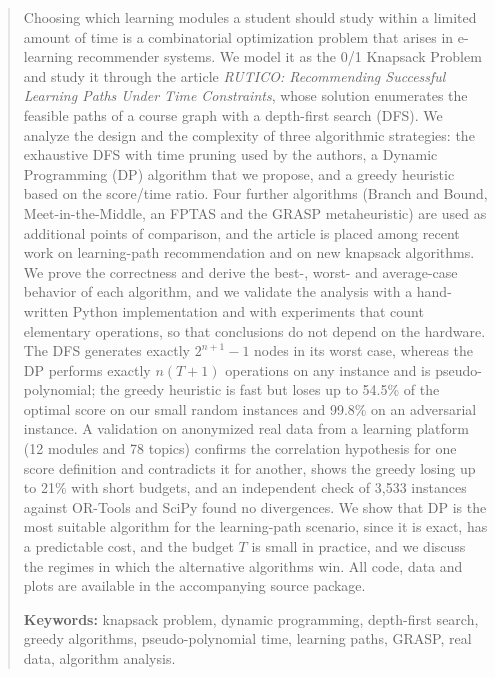 \documentclass[11pt,a4paper]{article}
\theoremstyle{plain}
\theoremstyle{definition}
\theoremstyle{remark}
\renewcommand{\_}{\textunderscore\hspace{0pt}}  %
\begin{document}
\begin{abstract}
\noindent Choosing which learning modules a student should study within a limited amount of time is a combinatorial optimization problem that arises in e-learning recommender systems. We model it as the 0/1 Knapsack Problem and study it through the article \emph{RUTICO: Recommending Successful Learning Paths Under Time Constraints}, whose solution enumerates the feasible paths of a course graph with a depth-first search (DFS). We analyze the design and the complexity of three algorithmic strategies: the exhaustive DFS with time pruning used by the authors, a Dynamic Programming (DP) algorithm that we propose, and a greedy heuristic based on the score/time ratio. Four further algorithms (Branch and Bound, Meet-in-the-Middle, an FPTAS and the GRASP metaheuristic) are used as additional points of comparison, and the article is placed among recent work on learning-path recommendation and on new knapsack algorithms. We prove the correctness and derive the best-, worst- and average-case behavior of each algorithm, and we validate the analysis with a hand-written Python implementation and with experiments that count elementary operations, so that conclusions do not depend on the hardware. The DFS generates exactly $2^{n+1}-1$ nodes in its worst case, whereas the DP performs exactly $n(T+1)$ operations on any instance and is pseudo-polynomial; the greedy heuristic is fast but loses up to 54.5\% of the optimal score on our small random instances and 99.8\% on an adversarial instance. A validation on anonymized real data from a learning platform (12 modules and 78 topics) confirms the correlation hypothesis for one score definition and contradicts it for another, shows the greedy losing up to 21\% with short budgets, and an independent check of 3,533 instances against OR-Tools and SciPy found no divergences. We show that DP is the most suitable algorithm for the learning-path scenario, since it is exact, has a predictable cost, and the budget $T$ is small in practice, and we discuss the regimes in which the alternative algorithms win. All code, data and plots are available in the accompanying source package.

\vspace{0.4cm}
\noindent\textbf{Keywords:} knapsack problem, dynamic programming, depth-first search, greedy algorithms, pseudo-polynomial time, learning paths, GRASP, real data, algorithm analysis.
\end{abstract}

\clearpage
\tableofcontents
\clearpage
{}















\appendix

\end{document}
